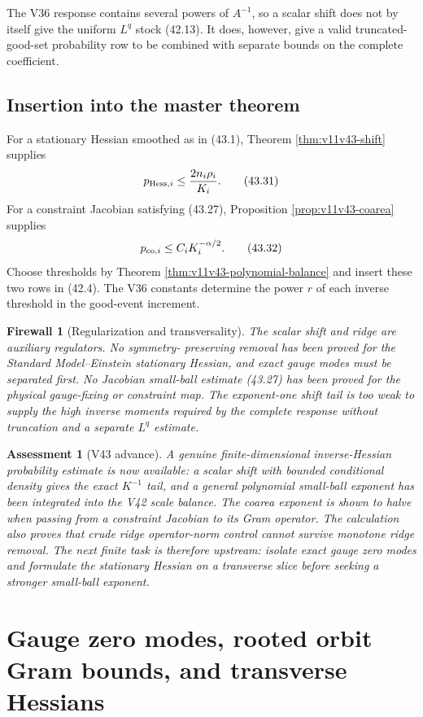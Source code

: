 \documentclass[11pt]{article}
\newtheorem{assessment}[theorem]{Assessment}
\newtheorem{firewall}[theorem]{Firewall}
\begin{document}
The V36 response contains several powers of \(A^{-1}\), so a scalar
shift does not by itself give the uniform \(L^q\) stock (42.13).
It does, however, give a valid truncated-good-set probability row to be
combined with separate bounds on the complete coefficient.

\subsection{Insertion into the master theorem}

For a stationary Hessian smoothed as in (43.1), Theorem
\ref{thm:v11v43-shift} supplies
\[
 p_{{\rm Hess},i}
 \leq\frac{2n_i\rho_i}{K_i}.
 \tag{43.31}
\]
For a constraint Jacobian satisfying (43.27), Proposition
\ref{prop:v11v43-coarea} supplies
\[
 p_{{\rm co},i}
 \leq C_iK_i^{-\alpha/2}.
 \tag{43.32}
\]
Choose thresholds by Theorem
\ref{thm:v11v43-polynomial-balance} and insert these two rows in
(42.4).  The V36 constants determine the power \(r\) of each inverse
threshold in the good-event increment.

\begin{firewall}[Regularization and transversality]
\label{fw:v11v43-regularization}
The scalar shift and ridge are auxiliary regulators.  No symmetry-
preserving removal has been proved for the Standard Model--Einstein
stationary Hessian, and exact gauge modes must be separated first.
No Jacobian small-ball estimate (43.27) has been proved for the physical
gauge-fixing or constraint map.  The exponent-one shift tail is too weak
to supply the high inverse moments required by the complete response
without truncation and a separate \(L^q\) estimate.
\end{firewall}

\begin{assessment}[V43 advance]
\label{ass:v11v43}
A genuine finite-dimensional inverse-Hessian probability estimate is
now available: a scalar shift with bounded conditional density gives
the exact \(K^{-1}\) tail, and a general polynomial small-ball exponent
has been integrated into the V42 scale balance.  The coarea exponent is
shown to halve when passing from a constraint Jacobian to its Gram
operator.  The calculation also proves that crude ridge operator-norm
control cannot survive monotone ridge removal.  The next finite task is
therefore upstream: isolate exact gauge zero modes and formulate the
stationary Hessian on a transverse slice before seeking a stronger
small-ball exponent.
\end{assessment}
\section{Gauge zero modes, rooted orbit Gram bounds, and transverse Hessians}
\label{sec:v11v44}
\end{document}
